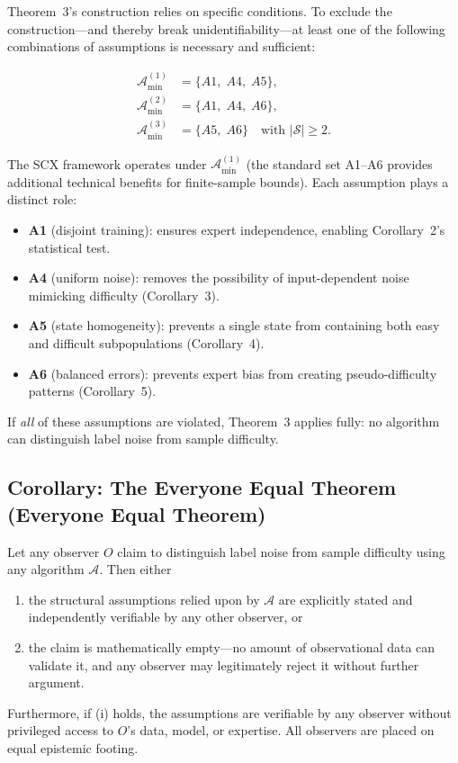 Theorem~3's construction relies on specific conditions.  To exclude the
construction---and thereby break unidentifiability---at least one of the
following combinations of assumptions is necessary and sufficient:

\[
\begin{aligned}
\mathcal{A}_{\min}^{(1)} &= \{A1,\;A4,\;A5\},\\
\mathcal{A}_{\min}^{(2)} &= \{A1,\;A4,\;A6\},\\
\mathcal{A}_{\min}^{(3)} &= \{A5,\;A6\}\quad\text{with }|\mathcal{S}|\ge2.
\end{aligned}
\]

The SCX framework operates under $\mathcal{A}_{\min}^{(1)}$ (the standard
set A1--A6 provides additional technical benefits for finite-sample bounds).
Each assumption plays a distinct role:
\begin{itemize}
  \item \textbf{A1} (disjoint training): ensures expert independence, enabling
    Corollary~2's statistical test.
  \item \textbf{A4} (uniform noise): removes the possibility of
    input-dependent noise mimicking difficulty (Corollary~3).
  \item \textbf{A5} (state homogeneity): prevents a single state from
    containing both easy and difficult subpopulations (Corollary~4).
  \item \textbf{A6} (balanced errors): prevents expert bias from creating
    pseudo-difficulty patterns (Corollary~5).
\end{itemize}

If \emph{all} of these assumptions are violated, Theorem~3 applies fully:
no algorithm can distinguish label noise from sample difficulty.

\subsection{Corollary: The Everyone Equal Theorem (Everyone Equal Theorem)}
\label{sec:thm3_equal}

\begin{corollary}
\label{cor:everyone-equal}
Let any observer $O$ claim to distinguish label noise from sample difficulty
using any algorithm $\mathcal{A}$. Then either
\begin{enumerate}[label=(\roman*)]
  \item the structural assumptions relied upon by $\mathcal{A}$ are
    explicitly stated and independently verifiable by any other observer,
    or
  \item the claim is mathematically empty---no amount of observational
    data can validate it, and any observer may legitimately reject it
    without further argument.
\end{enumerate}
Furthermore, if (i) holds, the assumptions are verifiable by any observer
without privileged access to $O$'s data, model, or expertise. All observers
are placed on equal epistemic footing.
\end{corollary}

